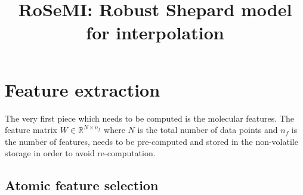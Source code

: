 \documentclass[12pt]{article}
\title{RoSeMI: Robust Shepard model for interpolation}
\begin{document}
\maketitle


\section{Feature extraction}
The very first piece which needs to be computed is the molecular features. The feature matrix $W \in \mathbb{R}^{N \times n_f}$ where $N$ is the total number of data points and $n_f$ is the number of features, needs to be pre-computed and stored in the non-volatile storage in order to avoid re-computation.
\subsection{Atomic feature selection}
\end{document}
